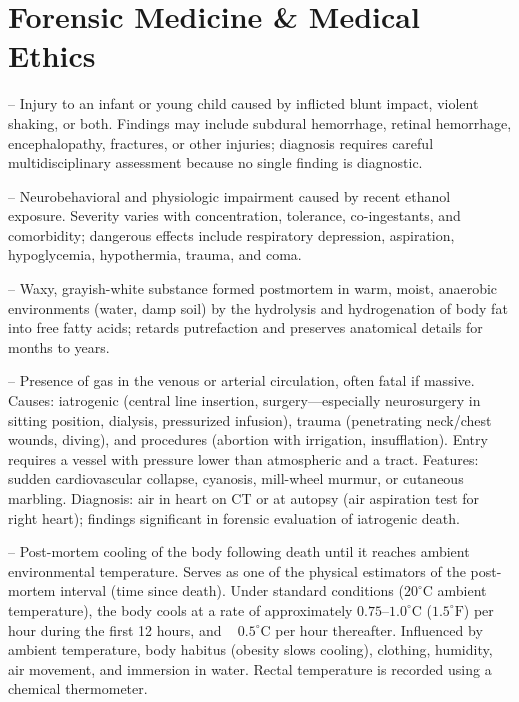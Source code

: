 \chapter{Forensic Medicine \& Medical Ethics}

-- Injury to an infant or young child caused by inflicted blunt impact, violent shaking, or both. Findings may include subdural hemorrhage, retinal hemorrhage, encephalopathy, fractures, or other injuries; diagnosis requires careful multidisciplinary assessment because no single finding is diagnostic.


-- Neurobehavioral and physiologic impairment caused by recent ethanol exposure. Severity varies with concentration, tolerance, co-ingestants, and comorbidity; dangerous effects include respiratory depression, aspiration, hypoglycemia, hypothermia, trauma, and coma.

-- Waxy, grayish-white substance formed postmortem in warm, moist, anaerobic environments (water, damp soil) by the hydrolysis and hydrogenation of body fat into free fatty acids; retards putrefaction and preserves anatomical details for months to years.

-- Presence of gas in the venous or arterial circulation, often fatal if massive. Causes: iatrogenic (central line insertion, surgery—especially neurosurgery in sitting position, dialysis, pressurized infusion), trauma (penetrating neck/chest wounds, diving), and procedures (abortion with irrigation, insufflation). Entry requires a vessel with pressure lower than atmospheric and a tract. Features: sudden cardiovascular collapse, cyanosis, mill-wheel murmur, or cutaneous marbling. Diagnosis: air in heart on CT or at autopsy (air aspiration test for right heart); findings significant in forensic evaluation of iatrogenic death.

-- Post-mortem cooling of the body following death until it reaches ambient environmental temperature. Serves as one of the physical estimators of the post-mortem interval (time since death). Under standard conditions ($20^\circ\text{C}$ ambient temperature), the body cools at a rate of approximately $0.75\text{--}1.0^\circ\text{C}$ ($1.5^\circ\text{F}$) per hour during the first 12 hours, and ~ $0.5^\circ\text{C}$ per hour thereafter. Influenced by ambient temperature, body habitus (obesity slows cooling), clothing, humidity, air movement, and immersion in water. Rectal temperature is recorded using a chemical thermometer.

